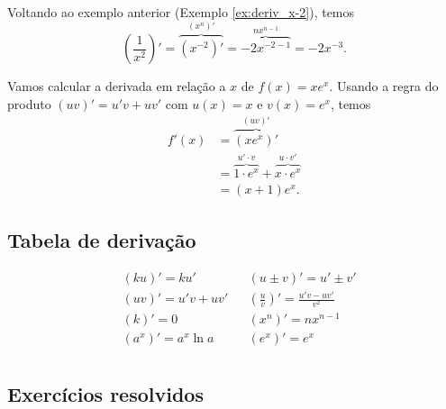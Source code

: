 \begin{ex}
  Voltando ao exemplo anterior (Exemplo \ref{ex:deriv_x-2}), temos
  \begin{equation}
    \left(\frac{1}{x^2}\right)' = \overbrace{(x^{-2})'}^{(x^n)'} = \overbrace{-2x^{-2-1}}^{nx^{n-1}} = -2x^{-3}.
  \end{equation}
\end{ex}

\begin{ex}
  Vamos calcular a derivada em relação a $x$ de $f(x) = xe^x$. Usando a regra do produto $(uv)' = u'v + uv'$ com $u(x) = x$ e $v(x) = e^x$, temos
  \begin{align}
    f'(x) &= \overbrace{(xe^x)'}^{(uv)'}\\
          &= \overbrace{1\cdot e^x}^{u'\cdot v} + \overbrace{x\cdot e^x}^{u\cdot v'}\\
          &= (x + 1)e^x.
  \end{align}
\end{ex}

\subsection{Tabela de derivação}

\begin{align*}
  &(ku)' = ku' && (u\pm v)' = u' \pm v'\\
  &(uv)' = u'v + uv' && \left(\frac{u}{v}\right)' = \frac{u'v - uv'}{v^2} \\
  &(k)' = 0 && (x^n)' = nx^{n-1}\\
  &(a^x)' = a^x\ln a && (e^x)' = e^x \\
\end{align*}


\subsection*{Exercícios resolvidos}

